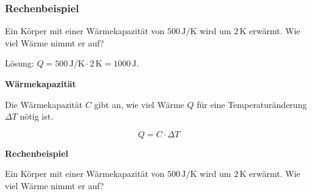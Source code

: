 \begin{frame}[t]
\frametitle{Rechenbeispiel}

Ein Körper mit einer Wärmekapazität von $500\,\mathrm{J/K}$ wird um
$2\,\mathrm{K}$ erwärmt. Wie viel Wärme nimmt er auf?


Lösung: $Q = 500\,\mathrm{J/K} \cdot 2\,\mathrm{K} = 1000\,\mathrm{J}$.



\end{frame}

\begin{frame}[t]

\par\medskip\noindent\textbf{Wärmekapazität}\par


Die Wärmekapazität $C$ gibt an, wie viel Wärme $Q$ für eine Temperaturänderung
$\Delta T$ nötig ist.

\[
Q = C \cdot \Delta T
\]

\par\medskip\noindent\textbf{Rechenbeispiel}\par


Ein Körper mit einer Wärmekapazität von $500\,\mathrm{J/K}$ wird um
$2\,\mathrm{K}$ erwärmt. Wie viel Wärme nimmt er auf?



\end{frame}

